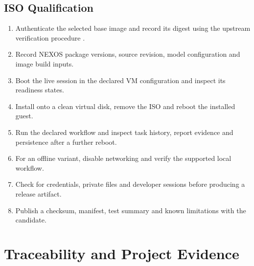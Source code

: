 \section{ISO Qualification}
\begin{enumerate}
\item Authenticate the selected base image and record its digest using the upstream verification procedure \cite{ubuntuverify}.
\item Record NEXOS package versions, source revision, model configuration and image build inputs.
\item Boot the live session in the declared VM configuration and inspect its readiness states.
\item Install onto a clean virtual disk, remove the ISO and reboot the installed guest.
\item Run the declared workflow and inspect task history, report evidence and persistence after a further reboot.
\item For an offline variant, disable networking and verify the supported local workflow.
\item Check for credentials, private files and developer sessions before producing a release artifact.
\item Publish a checksum, manifest, test summary and known limitations with the candidate.
\end{enumerate}

\chapter{Traceability and Project Evidence}
